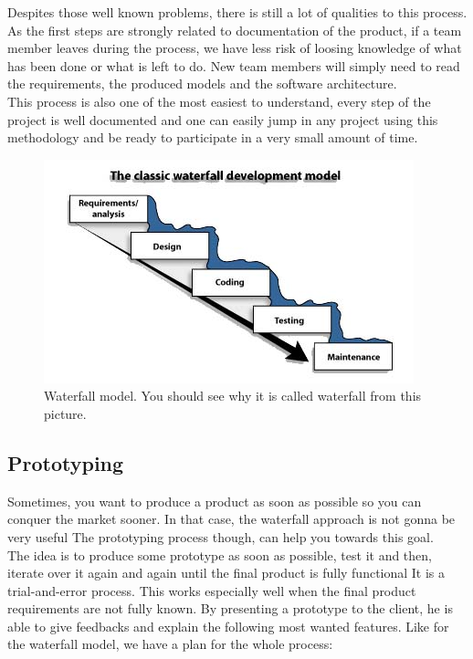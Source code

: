 \documentclass[12pt]{article}
\begin{document}
Despites those well known problems, there is still a lot of qualities to this process. As the first steps are strongly related to documentation of the product, if a team member leaves during the process, we have less risk of loosing knowledge of what has been done or what is left to do. New team members will simply need to read the requirements, the produced models and the software architecture.\\

This process is also one of the most easiest to understand, every step of the project is well documented and one can easily jump in any project using this methodology and be ready to participate in a very small amount of time.\\

\begin{figure}
    \centering
    \includegraphics[scale=0.8]{waterfall.jpg}
    \caption{Waterfall model. You should see why it is called waterfall from this picture.}
    \label{Waterfall}
\end{figure}

\subsection{Prototyping}

Sometimes, you want to produce a product as soon as possible so you can conquer the market sooner. In that case, the waterfall approach is not gonna be very useful The prototyping process though, can help you towards this goal.\\

The idea is to produce some prototype as soon as possible, test it and then, iterate over it again and again until the final product is fully functional It is a trial-and-error process. This works especially well when the final product requirements are not fully known. By presenting a prototype to the client, he is able to give feedbacks and explain the following most wanted features. Like for the waterfall model, we have a plan for the whole process:\\
\end{document}
